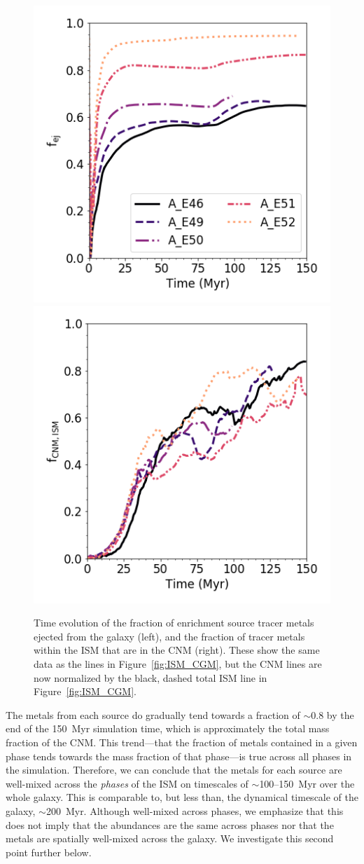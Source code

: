 \documentclass[twocolumn]{aastex62}
\begin{document}
\begin{figure}
  \centering
  \includegraphics[width=0.45\linewidth]{paper_CGM_average_evolution}
  \includegraphics[width=0.45\linewidth]{paper_CNM_average_evolution}
  \caption{Time evolution of the fraction of enrichment source tracer metals ejected from the galaxy (left), and the fraction of tracer metals within the ISM that are in the CNM (right). These show the same data as the lines in Figure~\ref{fig:ISM_CGM}, but the CNM lines are now normalized by the black, dashed total ISM line in Figure~\ref{fig:ISM_CGM}.  }
  \label{fig:CGM_CNM}
\end{figure}


The metals from each source do gradually tend towards a fraction of $\sim$0.8 by the end of the 150~Myr simulation time, which is approximately the total mass fraction of the CNM. This trend---that the fraction of metals contained in a given phase tends towards the mass fraction of that phase---is true across all phases in the simulation. Therefore, we can conclude that the metals for each source are well-mixed across the \textit{phases} of the ISM on timescales of $\sim$100--150~Myr over the whole galaxy. This is comparable to, but less than, the dynamical timescale of the galaxy, $\sim$200~Myr. Although well-mixed across phases, we emphasize that this does not imply that the abundances are the same across phases nor that the metals are spatially well-mixed across the galaxy. We investigate this second point further below.
\end{document}
